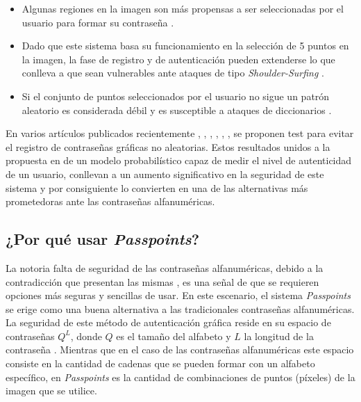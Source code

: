 \begin{itemize}
	\item Algunas regiones en la imagen son más propensas a ser seleccionadas por el usuario para formar su contraseña \cite{mypasswordhere}.
	
	\item Dado que este sistema basa su funcionamiento en la selección de 5 puntos en la imagen, la fase de registro y de autenticación pueden extenderse lo que conlleva a que sean vulnerables ante ataques de tipo \textit{Shoulder-Surfing} \cite{rodriguez2019algoritmo}.
	
	\item Si el conjunto de puntos seleccionados por el usuario no sigue un patrón aleatorio es considerada débil y es susceptible a ataques de diccionarios \cite{rodriguez2019algoritmo}.
\end{itemize}

En varios artículos publicados recientemente \cite{sym13050777}, \cite{lissetMaster}, \cite{s22051987}, \cite{herrera2023comparacion}, \cite{herrera2023nuevo}, \cite{herrera2023nuevoregulares}, \cite{herrera2024new} se proponen test para evitar el registro de contraseñas gráficas no aleatorias. Estos resultados unidos a la propuesta en \cite{legon2019nuevo} de un modelo probabilístico capaz de medir el nivel de autenticidad de un usuario, conllevan a un aumento significativo en la seguridad de este sistema y por consiguiente lo convierten en una de las alternativas más prometedoras ante las contraseñas alfanuméricas.



\subsection{¿Por qué usar \textit{Passpoints}?}

La notoria falta de seguridad de las contraseñas alfanuméricas, debido a la contradicción que presentan las mismas \cite{zimmermann2020password}, es una señal de que se requieren opciones más seguras y sencillas de usar. En este escenario, el sistema \textit{Passpoints} se erige como una buena alternativa a las tradicionales contraseñas alfanuméricas. La seguridad de este método de autenticación gráfica reside en su espacio de contraseñas \( Q^L \), donde \( Q \) es el tamaño del alfabeto y \( L \) la longitud de la contraseña \cite{legon2019nuevo}. Mientras que en el caso de las contraseñas alfanuméricas este espacio consiste en la cantidad de cadenas que se pueden formar con un alfabeto específico, en \textit{Passpoints} es la cantidad de combinaciones de puntos (píxeles) de la imagen que se utilice.


